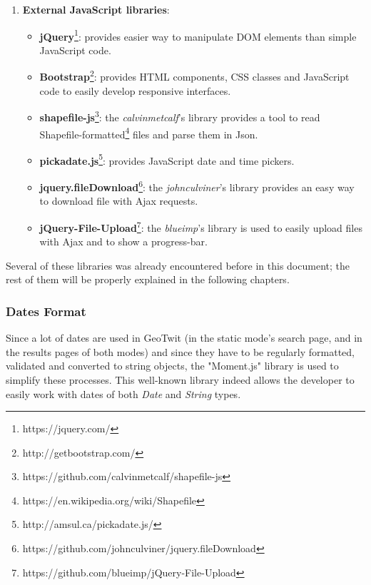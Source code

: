 \documentclass[a4paper,11pt]{report}
\begin{document}
\begin{enumerate}
	\item \textbf{External JavaScript libraries}:
	\begin{itemize}
		\item \textbf{jQuery}\footnote{https://jquery.com/}: provides easier way to manipulate DOM elements than simple JavaScript code.
		\item \textbf{Bootstrap}\footnote{http://getbootstrap.com/}: provides HTML components, CSS classes and JavaScript code to easily develop responsive interfaces.
		\item \textbf{shapefile-js}\footnote{https://github.com/calvinmetcalf/shapefile-js}: the \emph{calvinmetcalf}'s library provides a tool to read Shapefile-formatted\footnote{https://en.wikipedia.org/wiki/Shapefile} files and parse them in Json.
		\item \textbf{pickadate.js}\footnote{http://amsul.ca/pickadate.js/}: provides JavaScript date and time pickers.
		\item \textbf{jquery.fileDownload}\footnote{https://github.com/johnculviner/jquery.fileDownload}:  the \emph{johnculviner}'s library provides an easy way to download file with Ajax requests.
		\item \textbf{jQuery-File-Upload}\footnote{https://github.com/blueimp/jQuery-File-Upload}: the \emph{blueimp}'s library is used to easily upload files with Ajax and to show a progress-bar.
	\end{itemize}
\end{enumerate}

Several of these libraries was already encountered before in this document; the rest of them will be properly explained in the following chapters.
\bigskip

\subsubsection{Dates Format}
Since a lot of dates are used in GeoTwit (in the static mode's search page, and in the results pages of both modes) and since they have to be regularly formatted, validated and converted to string objects, the "Moment.js" library is used to simplify these processes. This well-known library indeed allows the developer to easily work with dates of both \emph{Date} and \emph{String} types.
\newpage
\end{document}
